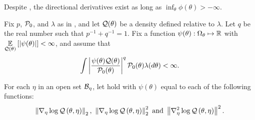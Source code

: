 
Despite , the directional derivatives exist
as long as $\inf_\theta \phi(\theta) > -\infty$.

\begin{assu}
%
Fix $p$, $\mathcal{P}_{0}$, and $\lambda$ as in , and let
$\mathcal{Q}(\theta)$ be a density defined relative to $\lambda$.  Let $q$ be the real
number such that $p^{-1} + q^{-1} = 1$.  Fix a function $\psi(\theta): \Omega_{\theta}
\mapsto \mathbb{R}$ with $\underset{\mathcal{Q}(\theta)}{\mathbb{E}}\left[\left|\psi(\theta)\right|\right] < \infty$, and
assume that
%
\begin{align*}
%
\int \abs{\frac{\psi(\theta) \q(\theta)}{\pbase(\theta)}}^q
\pbase(\theta) \lambda(d\theta) < \infty.
%
\end{align*}
%
%
\end{assu}


\begin{assu}
%
For each $\eta$ in an open set $\mathcal{B}_\eta$, let  hold with
$\psi(\theta)$ equal to each of the following functions:
%
\begin{align*}
%
 \norm{\lqgrad{\theta, \eta}}_2 \textrm{, }
 \norm{\lqgrad{\theta, \eta}}^2_2 \textrm{ and }
 \norm{\lqhess{\theta, \eta}}^2.
%
\end{align*}
%
\end{assu}



